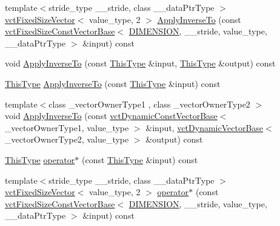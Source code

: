\begin{DoxyCompactItemize}
\item 
{\footnotesize template$<$stride\-\_\-type \-\_\-\-\_\-stride, class \-\_\-\-\_\-data\-Ptr\-Type $>$ }\\\hyperlink{classvct_fixed_size_vector}{vct\-Fixed\-Size\-Vector}$<$ value\-\_\-type, 2 $>$ \hyperlink{classvct_matrix_rotation2_base_a5b6c786ee91bddd0e3e1f8bfc2c5aa65}{Apply\-Inverse\-To} (const \hyperlink{classvct_fixed_size_const_vector_base}{vct\-Fixed\-Size\-Const\-Vector\-Base}$<$ \hyperlink{classvct_matrix_rotation2_base_ac10279ed12ec787b1a4833ea02771348acefb9855f54f0cfd782e785c9083e592}{D\-I\-M\-E\-N\-S\-I\-O\-N}, \-\_\-\-\_\-stride, value\-\_\-type, \-\_\-\-\_\-data\-Ptr\-Type $>$ \&input) const 
\item 
void \hyperlink{classvct_matrix_rotation2_base_a393700adcf3989d073a8720b1f71088d}{Apply\-Inverse\-To} (const \hyperlink{classvct_matrix_rotation2_base_a47ffeef2ddecede4b16bcc88fb432ff5}{This\-Type} \&input, \hyperlink{classvct_matrix_rotation2_base_a47ffeef2ddecede4b16bcc88fb432ff5}{This\-Type} \&output) const 
\item 
\hyperlink{classvct_matrix_rotation2_base_a47ffeef2ddecede4b16bcc88fb432ff5}{This\-Type} \hyperlink{classvct_matrix_rotation2_base_a8034acd9e429cc58532e1e0580cb50c2}{Apply\-Inverse\-To} (const \hyperlink{classvct_matrix_rotation2_base_a47ffeef2ddecede4b16bcc88fb432ff5}{This\-Type} \&input) const 
\item 
{\footnotesize template$<$class \-\_\-vector\-Owner\-Type1 , class \-\_\-vector\-Owner\-Type2 $>$ }\\void \hyperlink{classvct_matrix_rotation2_base_abfe2d56810552dd50e40645ba903c716}{Apply\-Inverse\-To} (const \hyperlink{classvct_dynamic_const_vector_base}{vct\-Dynamic\-Const\-Vector\-Base}$<$ \-\_\-vector\-Owner\-Type1, value\-\_\-type $>$ \&input, \hyperlink{classvct_dynamic_vector_base}{vct\-Dynamic\-Vector\-Base}$<$ \-\_\-vector\-Owner\-Type2, value\-\_\-type $>$ \&output) const 
\item 
\hyperlink{classvct_matrix_rotation2_base_a47ffeef2ddecede4b16bcc88fb432ff5}{This\-Type} \hyperlink{classvct_matrix_rotation2_base_ad15b098e978e41aa3772776b7efb28d6}{operator$\ast$} (const \hyperlink{classvct_matrix_rotation2_base_a47ffeef2ddecede4b16bcc88fb432ff5}{This\-Type} \&input) const 
\item 
{\footnotesize template$<$stride\-\_\-type \-\_\-\-\_\-stride, class \-\_\-\-\_\-data\-Ptr\-Type $>$ }\\\hyperlink{classvct_fixed_size_vector}{vct\-Fixed\-Size\-Vector}$<$ value\-\_\-type, 2 $>$ \hyperlink{classvct_matrix_rotation2_base_afa6a5310f8f3b1dfd422917f81613774}{operator$\ast$} (const \hyperlink{classvct_fixed_size_const_vector_base}{vct\-Fixed\-Size\-Const\-Vector\-Base}$<$ \hyperlink{classvct_matrix_rotation2_base_ac10279ed12ec787b1a4833ea02771348acefb9855f54f0cfd782e785c9083e592}{D\-I\-M\-E\-N\-S\-I\-O\-N}, \-\_\-\-\_\-stride, value\-\_\-type, \-\_\-\-\_\-data\-Ptr\-Type $>$ \&input) const 

\end{DoxyCompactItemize}
